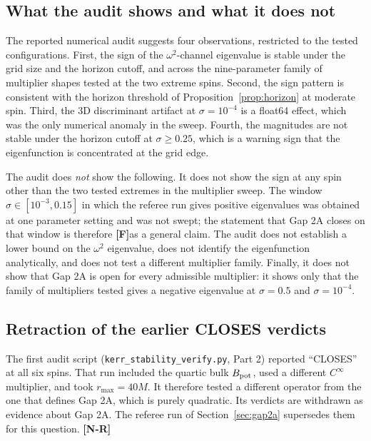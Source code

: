 \documentclass[11pt,a4paper]{article}
\newcommand{\VN}{\textcolor{vn}{\textbf{[N-R]}}}
\newcommand{\FF}{\textcolor{ff}{\textbf{[F]}}}
\theoremstyle{remark}
\theoremstyle{definition}
\begin{document}
\subsection{What the audit shows and what it does not}

The reported numerical audit suggests four observations, restricted to the tested configurations. First, the sign of the $\omega^2$-channel eigenvalue is stable under the grid size and the horizon cutoff, and across the nine-parameter family of multiplier shapes tested at the two extreme spins. Second, the sign pattern is consistent with the horizon threshold of Proposition~\ref{prop:horizon} at moderate spin. Third, the 3D discriminant artifact at $\sigma=10^{-4}$ is a float64 effect, which was the only numerical anomaly in the sweep. Fourth, the magnitudes are not stable under the horizon cutoff at $\sigma\ge 0.25$, which is a warning sign that the eigenfunction is concentrated at the grid edge.

The audit does \emph{not} show the following. It does not show the sign at any spin other than the two tested extremes in the multiplier sweep. The window $\sigma\in[10^{-3},0.15]$ in which the referee run gives positive eigenvalues was obtained at one parameter setting and was not swept; the statement that Gap 2A closes on that window is therefore \FF as a general claim. The audit does not establish a lower bound on the $\omega^2$ eigenvalue, does not identify the eigenfunction analytically, and does not test a different multiplier family. Finally, it does not show that Gap 2A is open for every admissible multiplier: it shows only that the family of multipliers tested gives a negative eigenvalue at $\sigma = 0.5$ and $\sigma = 10^{-4}$.

\subsection{Retraction of the earlier CLOSES verdicts}
\label{sec:retract}

The first audit script (\texttt{kerr\_stability\_verify.py}, Part 2) reported ``CLOSES'' at all six spins. That run included the quartic bulk $B_{\rm pot}$, used a different $C^\infty$ multiplier, and took $r_{\max} = 40M$. It therefore tested a different operator from the one that defines Gap 2A, which is purely quadratic. Its verdicts are withdrawn as evidence about Gap 2A. The referee run of Section~\ref{sec:gap2a} supersedes them for this question. \VN

\end{document}
